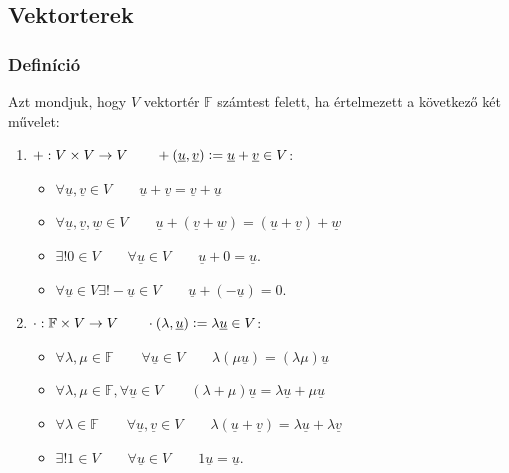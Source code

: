 \documentclass{article}
\begin{document}
\subsection{Vektorterek}

\subsubsection{Definíció}

Azt mondjuk, hogy $V$ vektortér $\mathbb{F}$ számtest felett, ha értelmezett a következő két művelet:
\begin{enumerate}
\item $+:V\times V\rightarrow V \qquad +\left(\underline{u},\underline{v}\right)\vcentcolon = \underline{u}+\underline{v}\in V$:
\begin{itemize}
\item $\forall \underline{u},\underline{v}\in V \qquad \underline{u}+\underline{v}=\underline{v}+\underline{u}$
\item $\forall \underline{u},\underline{v},\underline{w}\in V \qquad \underline{u}+\left(\underline{v}+\underline{w}\right)=\left(\underline{u}+\underline{v}\right)+\underline{w}$
\item $\exists!0\in V \qquad \forall \underline{u}\in V \qquad \underline{u}+0=\underline{u}$.
\item $\forall \underline{u}\in V \exists!-\underline{u}\in V \qquad  \underline{u}+\left(-\underline{u}\right)=0$.
\end{itemize}
\item $\cdot:\mathbb{F}\times V\rightarrow V \qquad \cdot\left(\lambda,\underline{u}\right)\vcentcolon = \lambda\underline{u}\in V$:
\begin{itemize}
\item $\forall \lambda,\mu\in\mathbb{F}\qquad \forall \underline{u}\in V \qquad \lambda\left(\mu\underline{u}\right)=\left(\lambda\mu\right)\underline{u}$
\item $\forall \lambda,\mu\in\mathbb{F}, \forall \underline{u}\in V \qquad \left(\lambda+\mu\right)\underline{u}=\lambda\underline{u}+\mu\underline{u}$
\item $\forall \lambda\in\mathbb{F}\qquad\forall \underline{u},\underline{v}\in V \qquad \lambda\left(\underline{u}+\underline{v}\right)=\lambda\underline{u}+\lambda\underline{v}$
\item $\exists!1\in V \qquad \forall \underline{u}\in V \qquad 1\underline{u}=\underline{u}$.
\end{itemize}
\end{enumerate}
\end{document}

